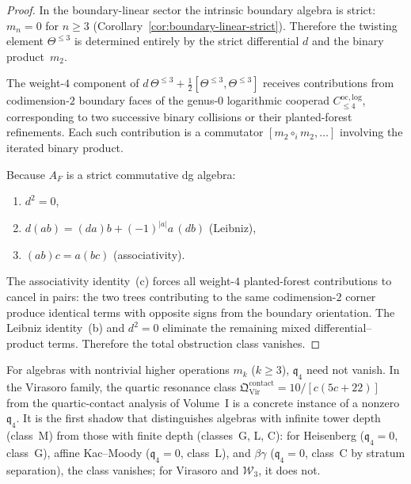 \begin{proof}
In the boundary-linear sector the intrinsic boundary algebra is
strict: $m_n = 0$ for $n \geq 3$
(Corollary~\ref{cor:boundary-linear-strict}). Therefore the
twisting element $\Theta^{\leq 3}$ is determined entirely by the
strict differential $d$ and the binary product~$m_2$.

The weight-$4$ component of $d\,\Theta^{\leq 3}
+ \tfrac{1}{2}[\Theta^{\leq 3},\Theta^{\leq 3}]$ receives
contributions from codimension-$2$ boundary faces of the
genus-$0$ logarithmic cooperad $C^{\mathrm{oc,log}}_{\leq 4}$,
corresponding to two successive binary collisions or their
planted-forest refinements. Each such contribution is a
commutator $[m_2 \circ_i m_2,\ldots]$ involving the iterated
binary product.

Because $A_F$ is a strict commutative dg algebra:
\begin{enumerate}[label=(\alph*)]
\item $d^2 = 0$,
\item $d(ab) = (da)b + (-1)^{|a|} a\,(db)$ (Leibniz),
\item $(ab)c = a(bc)$ (associativity).
\end{enumerate}
The associativity identity~(c) forces all weight-$4$
planted-forest contributions to cancel in pairs: the two trees
contributing to the same codimension-$2$ corner produce
identical terms with opposite signs from the boundary orientation.
The Leibniz identity~(b) and $d^2 = 0$ eliminate the remaining
mixed differential--product terms. Therefore the total
obstruction class vanishes.
\end{proof}

\begin{remark}
\label{rem:quartic-contact-beyond-BL}
For algebras with nontrivial higher operations $m_k$ ($k \geq 3$),
$\mathfrak{q}_4$ need not vanish. In the Virasoro family, the
quartic resonance class $\mathfrak{Q}^{\mathrm{contact}}_{\mathrm{Vir}}
= 10/[c(5c+22)]$ from the quartic-contact analysis of Volume~I is a
concrete instance
of a nonzero $\mathfrak{q}_4$. It is the first shadow that
distinguishes algebras with infinite tower depth (class~M) from
those with finite depth (classes~G, L, C): for Heisenberg
($\mathfrak{q}_4 = 0$, class~G), affine Kac--Moody
($\mathfrak{q}_4 = 0$, class~L), and $\beta\gamma$
($\mathfrak{q}_4 = 0$, class~C by stratum separation), the class
vanishes; for Virasoro and $\mathcal{W}_3$, it does not.
\end{remark}

